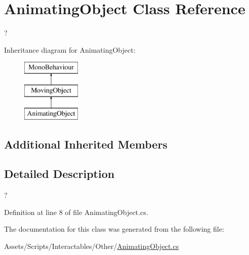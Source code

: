 \hypertarget{class_animating_object}{}\section{Animating\+Object Class Reference}
\label{class_animating_object}


?  


Inheritance diagram for Animating\+Object\+:\begin{figure}[H]
\begin{center}
\leavevmode
\includegraphics[height=3.000000cm]{class_animating_object}
\end{center}
\end{figure}
\subsection*{Additional Inherited Members}


\subsection{Detailed Description}
? 



Definition at line 8 of file Animating\+Object.\+cs.



The documentation for this class was generated from the following file\+:\begin{DoxyCompactItemize}
\item 
Assets/\+Scripts/\+Interactables/\+Other/\mbox{\hyperlink{_animating_object_8cs}{Animating\+Object.\+cs}}\end{DoxyCompactItemize}
